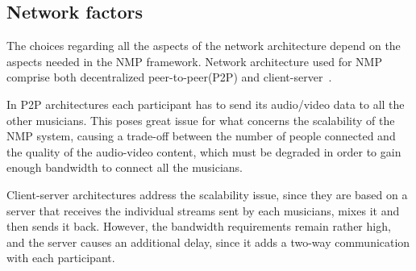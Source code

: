 \documentclass[conference]{IEEEtran}
\begin{document}

\subsection{Network factors}\label{subsec:network}
The choices regarding all the aspects of the network architecture depend on the aspects needed in the NMP framework. 
Network architecture used for NMP comprise both decentralized peer-to-peer(P2P) and client-server~\cite{RottondiOverview}. 

In P2P architectures each participant has to send its audio/video data to all the other musicians. This poses great issue for what concerns the scalability of the NMP system, causing a trade-off between the number of people connected and the quality of the audio-video content, which must be degraded in order to gain enough bandwidth to connect all the musicians.

Client-server architectures address the scalability issue, since they are based on a server that receives the individual streams sent by each musicians, mixes it and then sends it back. However, the bandwidth requirements remain rather high, and the server causes an additional delay, since it adds a two-way communication with each participant.
\end{document}
